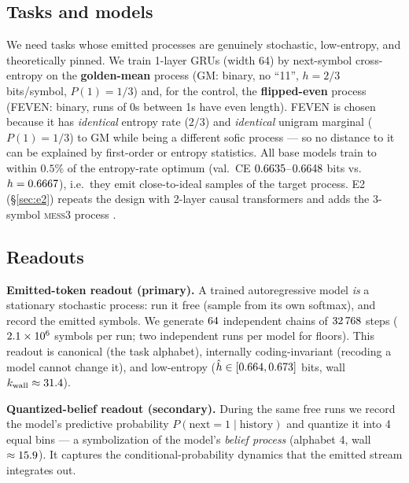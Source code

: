 \documentclass[11pt]{article}
\begin{document}
\subsection{Tasks and models}
We need tasks whose emitted processes are genuinely stochastic, low-entropy, and
theoretically pinned. We train 1-layer GRUs (width 64) by next-symbol cross-entropy
on the \textbf{golden-mean} process (GM: binary, no ``11'', $h = 2/3$ bits/symbol,
$P(1) = 1/3$) and, for the control, the \textbf{flipped-even} process (FEVEN: binary,
runs of 0s between 1s have even length). FEVEN is chosen because it has
\emph{identical} entropy rate ($2/3$) and \emph{identical} unigram marginal
($P(1) = 1/3$) to GM while being a different sofic process --- so no distance to it
can be explained by first-order or entropy statistics. All base models train to
within $0.5\%$ of the entropy-rate optimum (val.\ CE $0.6635$--$0.6648$ bits vs.\
$h = 0.6667$), i.e.\ they emit close-to-ideal samples of the target process. E2
(\S\ref{sec:e2}) repeats the design with 2-layer causal transformers and adds the
3-symbol \textsc{mess3} process \citep{marzen2017nearly, shai2024transformers}.

\subsection{Readouts}
\textbf{Emitted-token readout (primary).} A trained autoregressive model \emph{is} a
stationary stochastic process: run it free (sample from its own softmax), and record
the emitted symbols. We generate $64$ independent chains of $32\,768$ steps
($2.1\times10^{6}$ symbols per run; two independent runs per model for floors). This readout is
canonical (the task alphabet), internally coding-invariant (recoding a model cannot
change it), and low-entropy ($\hat h \in [0.664, 0.673]$ bits, wall
$k_{\mathrm{wall}} \approx 31.4$).

\textbf{Quantized-belief readout (secondary).} During the same free runs we record the
model's predictive probability $P(\text{next} = 1 \mid \text{history})$ and quantize
it into 4 equal bins --- a symbolization of the model's \emph{belief process}
\citep{shai2024transformers} (alphabet 4, wall $\approx 15.9$). It captures the
conditional-probability dynamics that the emitted stream integrates out.
\end{document}
